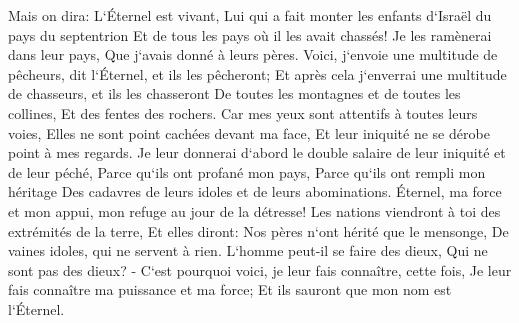 \verse Mais on dira: L`Éternel est vivant, Lui qui a fait monter les enfants d`Israël du pays du septentrion Et de tous les pays où il les avait chassés! Je les ramènerai dans leur pays, Que j`avais donné à leurs pères. 
\verse Voici, j`envoie une multitude de pêcheurs, dit l`Éternel, et ils les pêcheront; Et après cela j`enverrai une multitude de chasseurs, et ils les chasseront De toutes les montagnes et de toutes les collines, Et des fentes des rochers. 
\verse Car mes yeux sont attentifs à toutes leurs voies, Elles ne sont point cachées devant ma face, Et leur iniquité ne se dérobe point à mes regards. 
\verse Je leur donnerai d`abord le double salaire de leur iniquité et de leur péché, Parce qu`ils ont profané mon pays, Parce qu`ils ont rempli mon héritage Des cadavres de leurs idoles et de leurs abominations. 
\verse Éternel, ma force et mon appui, mon refuge au jour de la détresse! Les nations viendront à toi des extrémités de la terre, Et elles diront: Nos pères n`ont hérité que le mensonge, De vaines idoles, qui ne servent à rien. 
\verse L`homme peut-il se faire des dieux, Qui ne sont pas des dieux? - 
\verse C`est pourquoi voici, je leur fais connaître, cette fois, Je leur fais connaître ma puissance et ma force; Et ils sauront que mon nom est l`Éternel. 

